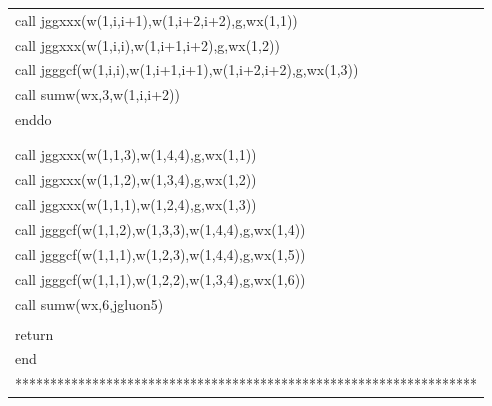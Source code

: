 \documentclass[a4paper,11pt]{article}
\begin{document}
\begin{center}
{\begin{supertabular}{l}
       \hspace{1em}   call jggxxx(w(1,i,i+1),w(1,i+2,i+2),g,wx(1,1))  \\
       \hspace{1em}    call jggxxx(w(1,i,i),w(1,i+1,i+2),g,wx(1,2))      \\
       \hspace{1em}    call jgggcf(w(1,i,i),w(1,i+1,i+1),w(1,i+2,i+2),g,wx(1,3))\\
       \hspace{1em}    call sumw(wx,3,w(1,i,i+2))\\
       \hspace{0.5em} enddo\\
      \\
 \\
      \hspace{0.5em} call jggxxx(w(1,1,3),w(1,4,4),g,wx(1,1))  \\
      \hspace{0.5em} call jggxxx(w(1,1,2),w(1,3,4),g,wx(1,2))    \\
      \hspace{0.5em} call jggxxx(w(1,1,1),w(1,2,4),g,wx(1,3))      \\
      \hspace{0.5em} call jgggcf(w(1,1,2),w(1,3,3),w(1,4,4),g,wx(1,4)) \\
      \hspace{0.5em} call jgggcf(w(1,1,1),w(1,2,3),w(1,4,4),g,wx(1,5))   \\
      \hspace{0.5em} call jgggcf(w(1,1,1),w(1,2,2),w(1,3,4),g,wx(1,6))     \\
      \hspace{0.5em} call sumw(wx,6,jgluon5)\\
 \\
     \hspace{0.5em} return\\
     \hspace{0.5em} end\\
******************************************************************\\
\end{supertabular}
}\\
\end{center}
\end{document}
